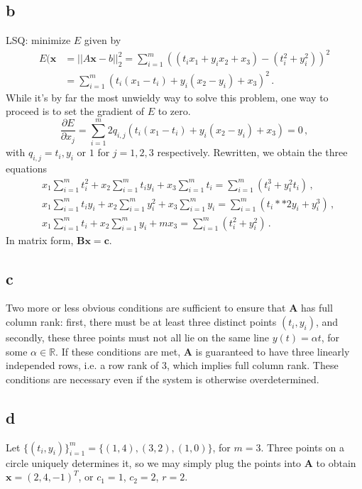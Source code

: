 \documentclass[11pt]{amsart}
\theoremstyle{definition}
\newcommand{\R}{\mathbb{R}}
\numberwithin{equation}{section}
\begin{document}
\subsection*{b}
LSQ: minimize $E$ given by
\begin{align*}
E(\mathbf{x}
&=
||A\mathbf{x}-  b||_2^2
=
\sum_{i=1}^m\left(
(t_i x_1 + y_i x_2 + x_3) - (t_i^2 + y_i^2)\right)^2 \\
&=
\sum_{i=1}^m
\left(
t_i(x_1 - t_i) + y_i(x_2 - y_i) + x_3
\right)^2\,.
\end{align*}
While it's by far the most unwieldy way to solve this problem, one way to proceed is to set the gradient of $E$ to zero.
\begin{equation}
\frac{\partial E}{\partial x_j}
=
\sum_{i=1}^m
2q_{i,j} (t_i(x_1 - t_i) + y_i(x_2 - y_i) + x_3) = 0\,,
\end{equation}
with $q_{i,j} = t_i, y_i$ or $1$ for $j = 1,2,3$ respectively.
Rewritten, we obtain the three equations
\begin{align}
&
x_1
\sum_{i=1}^m t_i^2 + x_2 \sum_{i=1}^m t_i y_i + x_3 \sum_{i=1}^m t_i
 = \sum_{i=1}^m(t_i^3 + y_i^2 t_i) \,,\\
&x_1 \sum_{i=1}^m t_i y_i + x_2 \sum_{i=1}^m y_i^2 + x_3 \sum_{i=1}^m y_i = \sum_{i=1}^m\left(
t_i**2 y_i + y_i^3
\right) \,,\\
&x_1 \sum_{i=1}^m t_i + x_2 \sum_{i=1}^m y_i + m x_3 = \sum_{i=1}^m \left(
t_i^2 + y_i^2
\right)\,.
\end{align}
In matrix form, $\mathbf{B}\mathbf{x} = \mathbf{c}$.
\subsection*{c}
Two more or less obvious conditions are sufficient to ensure that $\mathbf{A}$ has full column rank: first, there must be at least three distinct points $(t_i, y_i)$, and secondly, these three points must not all lie on the same line $y(t) = \alpha t$, for some $\alpha \in \R$. If these conditions are met, $\mathbf{A}$ is guaranteed to have three linearly independed rows, i.e. a row rank of 3, which implies full column rank. These conditions are necessary even if the system is otherwise overdetermined.
\subsection*{d}
Let $\{(t_i, y_i)\}_{i=1}^m = \{(1, 4),(3, 2),(1, 0)\}$, for $m=3$. Three points on a circle uniquely determines it, so we may simply plug the points into $\mathbf{A}$ to obtain
$\mathbf{x} = (2,4,-1)^T$, or
$c_1 = 1$, $c_2 = 2$, $r = 2$.
\end{document}
